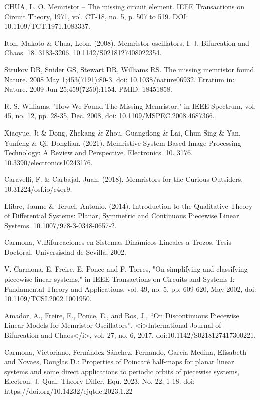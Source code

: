 \documentclass[12pt,a4paper]{report} %
\begin{document}
	
	\begin{thebibliography}{99}
		 CHUA, L. O. Memristor – The missing circuit element. IEEE
		Transactions on Circuit Theory, 1971, vol. CT-18, no. 5, p. 507 to
		519. DOI: 10.1109/TCT.1971.1083337.
		
		 Itoh, Makoto \& Chua, Leon. (2008). Memristor oscillators. I. J. Bifurcation and Chaos. 18. 3183-3206. 10.1142/S0218127408022354. 
		
		 Strukov DB, Snider GS, Stewart DR, Williams RS. The missing memristor found. Nature. 2008 May 1;453(7191):80-3. doi: 10.1038/nature06932. Erratum in: Nature. 2009 Jun 25;459(7250):1154. PMID: 18451858.
		
		 R. S. Williams, "How We Found The Missing Memristor," in IEEE Spectrum, vol. 45, no. 12, pp. 28-35, Dec. 2008, doi: 10.1109/MSPEC.2008.4687366.
		
		 Xiaoyue, Ji \& Dong, Zhekang \& Zhou, Guangdong \& Lai, Chun Sing \& Yan, Yunfeng \& Qi, Donglian. (2021). Memristive System Based Image Processing Technology: A Review and Perspective. Electronics. 10. 3176. 10.3390/electronics10243176. 
		
		 Caravelli, F. \& Carbajal, Juan. (2018). Memristors for the Curious Outsiders. 10.31224/osf.io/c4qr9. 
		
		 Llibre, Jaume \& Teruel, Antonio. (2014). Introduction to the Qualitative Theory of Differential Systems: Planar, Symmetric and Continuous Piecewise Linear Systems. 10.1007/978-3-0348-0657-2. 
		
		 Carmona, V.Bifurcaciones en Sistemas Dinámicos Lineales a Trozos. Tesis Doctoral. Universisdad de Sevilla, 2002.
		
		 V. Carmona, E. Freire, E. Ponce and F. Torres, "On simplifying and classifying piecewise-linear systems," in IEEE Transactions on Circuits and Systems I: Fundamental Theory and Applications, vol. 49, no. 5, pp. 609-620, May 2002, doi: 10.1109/TCSI.2002.1001950.
		
		 Amador, A., Freire, E., Ponce, E., and Ros, J., “On Discontinuous Piecewise Linear Models for Memristor Oscillators”, <i>International Journal of Bifurcation and Chaos</i>, vol. 27, no. 6, 2017. doi:10.1142/S0218127417300221.
		
		 Carmona, Victoriano, Fernández-Sánchez, Fernando, García-Medina, Elisabeth and Novaes, Douglas D.: Properties of Poincaré half-maps for planar linear systems and some direct applications to periodic orbits of piecewise systems, Electron. J. Qual. Theory Differ. Equ. 2023, No. 22, 1-18. doi: https://doi.org/10.14232/ejqtde.2023.1.22
		

\end{thebibliography}
\end{document}
